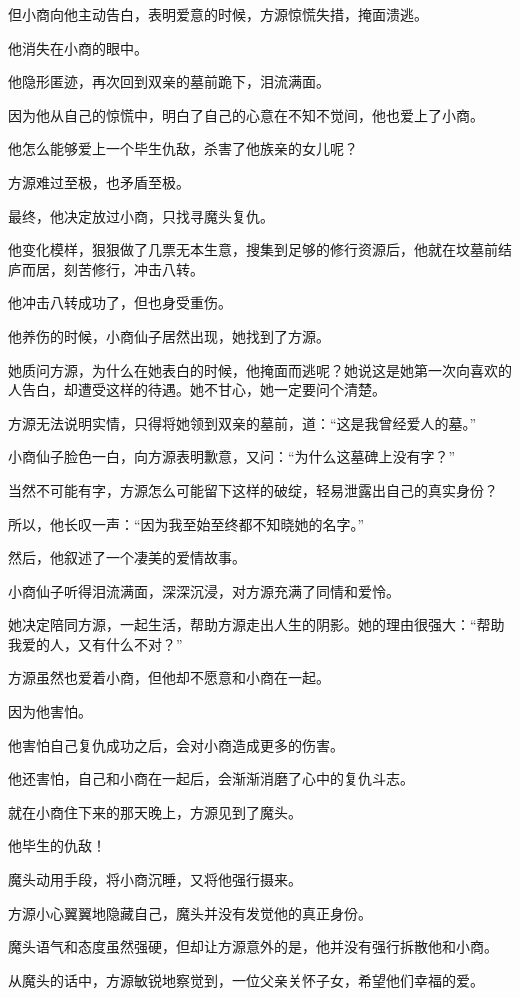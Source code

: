 \begin{this_body}
但小商向他主动告白，表明爱意的时候，方源惊慌失措，掩面溃逃。

他消失在小商的眼中。

他隐形匿迹，再次回到双亲的墓前跪下，泪流满面。

因为他从自己的惊慌中，明白了自己的心意在不知不觉间，他也爱上了小商。

他怎么能够爱上一个毕生仇敌，杀害了他族亲的女儿呢？

方源难过至极，也矛盾至极。

最终，他决定放过小商，只找寻魔头复仇。

他变化模样，狠狠做了几票无本生意，搜集到足够的修行资源后，他就在坟墓前结庐而居，刻苦修行，冲击八转。

他冲击八转成功了，但也身受重伤。

他养伤的时候，小商仙子居然出现，她找到了方源。

她质问方源，为什么在她表白的时候，他掩面而逃呢？她说这是她第一次向喜欢的人告白，却遭受这样的待遇。她不甘心，她一定要问个清楚。

方源无法说明实情，只得将她领到双亲的墓前，道：“这是我曾经爱人的墓。”

小商仙子脸色一白，向方源表明歉意，又问：“为什么这墓碑上没有字？”

当然不可能有字，方源怎么可能留下这样的破绽，轻易泄露出自己的真实身份？

所以，他长叹一声：“因为我至始至终都不知晓她的名字。”

然后，他叙述了一个凄美的爱情故事。

小商仙子听得泪流满面，深深沉浸，对方源充满了同情和爱怜。

她决定陪同方源，一起生活，帮助方源走出人生的阴影。她的理由很强大：“帮助我爱的人，又有什么不对？”

方源虽然也爱着小商，但他却不愿意和小商在一起。

因为他害怕。

他害怕自己复仇成功之后，会对小商造成更多的伤害。

他还害怕，自己和小商在一起后，会渐渐消磨了心中的复仇斗志。

就在小商住下来的那天晚上，方源见到了魔头。

他毕生的仇敌！

魔头动用手段，将小商沉睡，又将他强行摄来。

方源小心翼翼地隐藏自己，魔头并没有发觉他的真正身份。

魔头语气和态度虽然强硬，但却让方源意外的是，他并没有强行拆散他和小商。

从魔头的话中，方源敏锐地察觉到，一位父亲关怀子女，希望他们幸福的爱。


\end{this_body}
